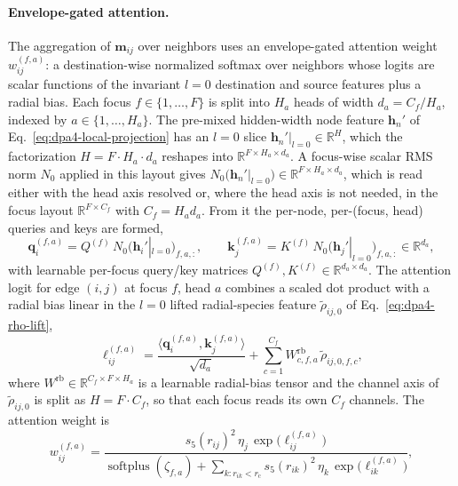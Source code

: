 \paragraph{Envelope-gated attention.}
\label{sec:attn}
The aggregation of $\mathbf{m}_{ij}$ over neighbors uses an envelope-gated attention weight $w_{ij}^{(f,a)}$: a destination-wise normalized softmax over neighbors whose logits are scalar functions of the invariant $l=0$ destination and source features plus a radial bias.
Each focus $f\in\{1,\dots,F\}$ is split into $H_a$ heads of width $d_a=C_f/H_a$, indexed by $a\in\{1,\dots,H_a\}$.
The pre-mixed hidden-width node feature $\mathbf{h}_n'$ of Eq.~\eqref{eq:dpa4-local-projection} has an $l=0$ slice $\mathbf{h}_n'|_{l=0}\in\mathbb{R}^{H}$, which the factorization $H=F\cdot H_a\cdot d_a$ reshapes into $\mathbb{R}^{F\times H_a\times d_a}$.
A focus-wise scalar RMS norm $N_0$ applied in this layout gives
$N_0\bigl(\mathbf{h}_n'|_{l=0}\bigr)\in\mathbb{R}^{F\times H_a\times d_a}$,
which is read either with the head axis resolved or, where the head axis is not
needed, in the focus layout $\mathbb{R}^{F\times C_f}$ with $C_f=H_a d_a$.
From it the per-node, per-(focus, head) queries and keys are formed,
\begin{equation}
    \mathbf{q}_i^{(f,a)}
    = Q^{(f)}\,N_0\bigl(\mathbf{h}_i'|_{l=0}\bigr)_{f,a,:},\qquad
    \mathbf{k}_j^{(f,a)}
    = K^{(f)}\,N_0\bigl(\mathbf{h}_j'|_{l=0}\bigr)_{f,a,:}
    \in\mathbb{R}^{d_a},
    \label{eq:dpa4-attn-qk}
\end{equation}
with learnable per-focus query/key matrices $Q^{(f)},K^{(f)}\in
    \mathbb{R}^{d_a\times d_a}$. The attention logit for edge $(i,j)$ at focus
$f$, head $a$ combines a scaled dot product with a radial bias linear in the
$l=0$ lifted radial-species feature $\widetilde{\rho}_{ij,0}$ of Eq.~\eqref{eq:dpa4-rho-lift},
\begin{equation}
    \ell_{ij}^{(f,a)}
    =
    \frac{\langle\mathbf{q}_i^{(f,a)},\mathbf{k}_j^{(f,a)}\rangle}{\sqrt{d_a}}
    + \sum_{c=1}^{C_f}
    W^{\mathrm{rb}}_{c,f,a}\,\widetilde{\rho}_{ij,0,f,c}, \label{eq:dpa4-attn-logit} \end{equation} where $W^{\mathrm{rb}}\in\mathbb{R}^{C_f\times F\times H_a}$ is a learnable radial-bias tensor and the channel axis of $\widetilde{\rho}_{ij,0}$ is split as $H=F\cdot C_f$, so that each focus reads its own $C_f$ channels.
The attention weight is
\begin{equation}
    w_{ij}^{(f,a)}
    =
    \frac{s_5(r_{ij})^2\,\eta_j\,\exp\!\bigl(\ell_{ij}^{(f,a)}\bigr)}
    {\operatorname{softplus}(\zeta_{f,a})
        +\sum_{k:r_{ik}<r_{\mathrm{c}}}
        s_5(r_{ik})^2\,\eta_k\,\exp\!\bigl(\ell_{ik}^{(f,a)}\bigr)},
    \label{eq:dpa4-attention}
\end{equation}
